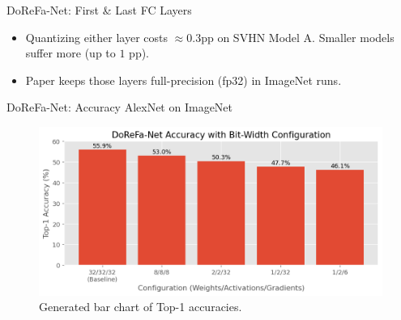 \documentclass[aspectratio=169]{beamer} %
\begin{document}
\begin{frame}{DoReFa-Net: First \& Last FC Layers}
  \begin{itemize}
    \item Quantizing either layer costs $\approx 0.3$pp on SVHN Model A. Smaller models suffer more (up to $1$ pp).
    \item Paper keeps those layers full-precision (fp32) in ImageNet runs.
  \end{itemize}
\end{frame}

\begin{frame}{DoReFa-Net: Accuracy AlexNet on ImageNet}
  \begin{figure}
    \centering
    \includegraphics[width=\linewidth]{figures/dorefaRes.png}
    \caption*{\scriptsize Generated bar chart of Top-1 accuracies.}
  \end{figure}
\end{frame}
\end{document}
